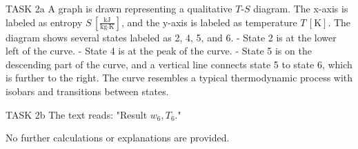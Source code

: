 TASK 2a  
A graph is drawn representing a qualitative \( T \)-\( S \) diagram. The x-axis is labeled as entropy \( S \, \left[\frac{\text{kJ}}{\text{kg·K}}\right] \), and the y-axis is labeled as temperature \( T \, [\text{K}] \). The diagram shows several states labeled as 2, 4, 5, and 6.  
- State 2 is at the lower left of the curve.  
- State 4 is at the peak of the curve.  
- State 5 is on the descending part of the curve, and a vertical line connects state 5 to state 6, which is further to the right.  
The curve resembles a typical thermodynamic process with isobars and transitions between states.  

TASK 2b  
The text reads: "Result \( w_6, T_6 \)."  

No further calculations or explanations are provided.